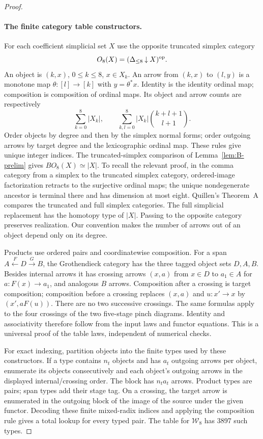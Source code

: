 \begin{proof}
\paragraph{The finite category table constructors.}
For each coefficient simplicial set $X$ use the opposite truncated
simplex category
\[
 O_8(X)=(\Delta_{\leq8}\mathbin{\downarrow}X)^{\rm op}.
\]
An object is $(k,x)$, $0\leq k\leq8$, $x\in X_k$. An arrow
from $(k,x)$ to $(l,y)$ is a monotone map
$\theta:[l]\to[k]$ with $y=\theta^*x$. Identity is the identity
ordinal map; composition is composition of ordinal maps. Its
object and arrow counts are respectively
\[
 \sum_{k=0}^8|X_k|,\qquad
 \sum_{k,l=0}^8|X_k|\binom{k+l+1}{l+1}.
\]
Order objects by degree and then by the simplex normal forms;
order outgoing arrows by target degree and the lexicographic
ordinal map. These rules give unique integer indices. The
truncated-simplex comparison of Lemma~\ref{lem:B-prelim} gives
$BO_8(X)\simeq|X|$. To recall the relevant proof, in the comma
category from a simplex to the truncated simplex category,
ordered-image factorization retracts to the surjective ordinal
maps; the unique nondegenerate ancestor is terminal there and
has dimension at most eight. Quillen's Theorem~A compares the
truncated and full simplex categories. The full simplicial
replacement has the homotopy type of $|X|$. Passing to the
opposite category preserves realization. Our convention makes
the number of arrows out of an object depend only on its degree.

Products use ordered pairs and coordinatewise composition.
For a span $A\xleftarrow{F}D\xrightarrow{G}B$, the Grothendieck
category has the three tagged object sets $D,A,B$. Besides
internal arrows it has crossing arrows $(x,a)$ from $x\in D$
to $a_1\in A$ for $a:F(x)\to a_1$, and analogous $B$ arrows.
Composition after a crossing is target composition; composition
before a crossing replaces $(x,a)$ and $u:x'\to x$ by
$(x',aF(u))$. There are no two successive crossings.
The same formulas apply to the four crossings of the two
five-stage pinch diagrams. Identity and associativity therefore
follow from the input laws and functor equations. This is a
universal proof of the table laws, independent of numerical checks.

For exact indexing, partition objects into the finite types used
by these constructors. If a type contains $n_t$ objects and has
$a_t$ outgoing arrows per object, enumerate its objects
consecutively and each object's outgoing arrows in the displayed
internal/crossing order. The block has $n_ta_t$ arrows.
Product types are pairs; span types add their stage tag.
On a crossing, the target arrow is enumerated in the outgoing
block of the image of the source under the given functor.
Decoding these finite mixed-radix indices and applying the
composition rule gives a total lookup for every typed pair.
The table for $\mathcal W_8$ has 3897 such types.


\end{proof}
